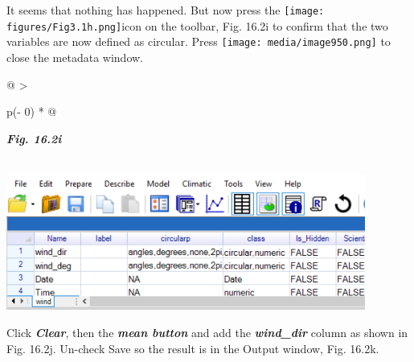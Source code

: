 \documentclass[
  letterpaper,
  DIV=11,
  numbers=noendperiod]{scrreprt}
\begin{document}
It seems that nothing has happened. But now press the
\texttt{[image: figures/Fig3.1h.png]}icon
on the toolbar, Fig. 16.2i to confirm that the two variables are now
defined as circular. Press
\texttt{[image: media/image950.png]}
to close the metadata window.

\begin{longtable}[]{@{}
  >{\raggedright\arraybackslash}p{(\columnwidth - 0\tabcolsep) * }@{}}
\toprule\noalign{}
\begin{minipage}[b]{\linewidth}\raggedright
\textbf{\emph{Fig. 16.2i}}
\end{minipage} \\
\midrule\noalign{}
\endhead
\bottomrule\noalign{}
\endlastfoot
\includegraphics[width=4.65066in,height=1.76483in]{figures/Fig16.2i.png} \\
\end{longtable}

Click \textbf{\emph{Clear}}, then the \textbf{\emph{mean button}} and
add the \textbf{\emph{wind\_dir}} column as shown in Fig. 16.2j.
Un-check Save so the result is in the Output window, Fig. 16.2k.
\end{document}
